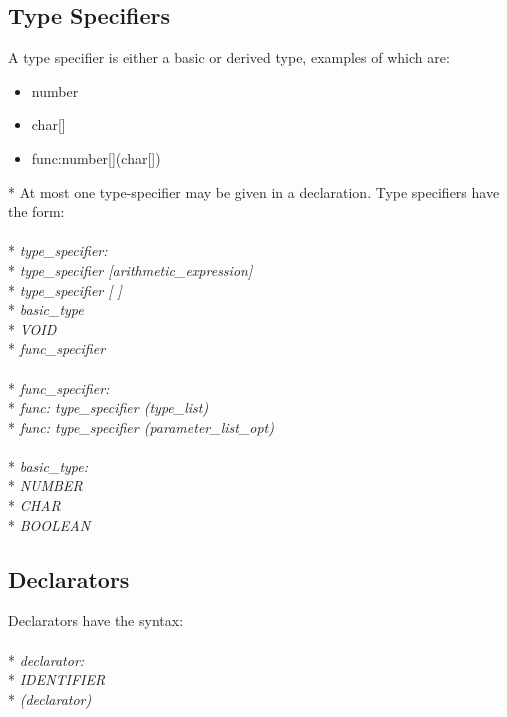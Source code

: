 \subsection{Type Specifiers}
A type specifier is either a basic or derived type, examples of which are:
\begin{itemize}
\item
number
\item
char[]
\item
func:number[](char[])
\end{itemize}
* At most one type-specifier may be given in a declaration. Type specifiers have the form:
\\ \\* \tab \emph{type\_specifier:}
\\* \tab \tab \emph{type\_specifier [arithmetic\_expression]}
\\* \tab \tab \emph{type\_specifier [ ]}
\\* \tab \tab \emph{basic\_type}
\\* \tab \tab \emph{VOID}
\\* \tab \tab \emph{func\_specifier}
\\ \\* \tab \emph{func\_specifier:}
\\* \tab \tab \emph{func: type\_specifier (type\_list)}
\\* \tab \tab \emph{func: type\_specifier (parameter\_list\_opt)}
\\ \\* \tab \emph{basic\_type:}
\\* \tab \tab \emph{NUMBER}
\\* \tab \tab \emph{CHAR}
\\* \tab \tab \emph{BOOLEAN}

\subsection{Declarators}
Declarators have the syntax:
\\ \\* \tab \emph{declarator:}
\\* \tab \tab \emph{IDENTIFIER}
\\* \tab \tab \emph{(declarator)}

